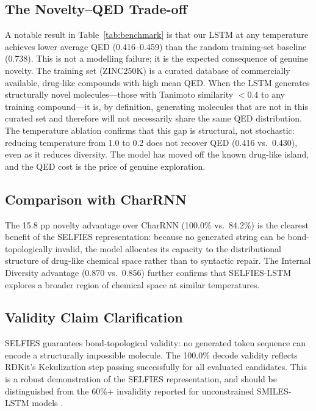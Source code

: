 \documentclass[conference]{IEEEtran}
\begin{document}
\subsection{The Novelty--QED Trade-off}

A notable result in Table~\ref{tab:benchmark} is that our LSTM at any temperature achieves lower average QED (0.416--0.459) than the random training-set baseline (0.738). This is not a modelling failure; it is the expected consequence of genuine novelty. The training set (ZINC250K) is a curated database of commercially available, drug-like compounds with high mean QED. When the LSTM generates structurally novel molecules---those with Tanimoto similarity $<0.4$ to any training compound---it is, by definition, generating molecules that are not in this curated set and therefore will not necessarily share the same QED distribution. The temperature ablation confirms that this gap is structural, not stochastic: reducing temperature from 1.0 to 0.2 does not recover QED (0.416 vs.\ 0.430), even as it reduces diversity. The model has moved off the known drug-like island, and the QED cost is the price of genuine exploration.

\subsection{Comparison with CharRNN}

The 15.8 pp novelty advantage over CharRNN (100.0\% vs.\ 84.2\%) is the clearest benefit of the SELFIES representation: because no generated string can be bond-topologically invalid, the model allocates its capacity to the distributional structure of drug-like chemical space rather than to syntactic repair. The Internal Diversity advantage (0.870 vs.\ 0.856) further confirms that SELFIES-LSTM explores a broader region of chemical space at similar temperatures.

\subsection{Validity Claim Clarification}

SELFIES guarantees bond-topological validity: no generated token sequence can encode a structurally impossible molecule. The 100.0\% decode validity reflects RDKit's Kekulization step passing successfully for all evaluated candidates. This is a robust demonstration of the SELFIES representation, and should be distinguished from the 60\%+ invalidity reported for unconstrained SMILES-LSTM models \cite{ref5, ref8}.
\end{document}
